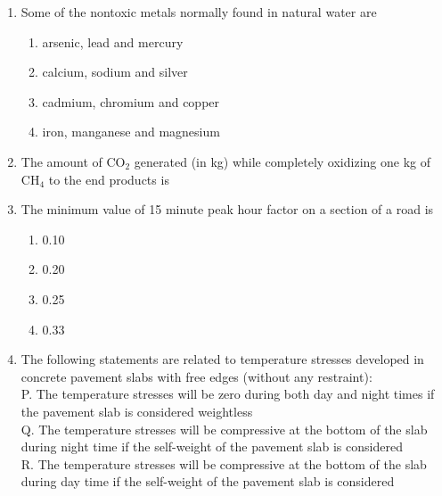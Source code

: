 \documentclass[journal,12pt,onecolumn]{IEEEtran}
\theoremstyle{remark}
\begin{document}
\begin{enumerate}
\item Some of the nontoxic metals normally found in natural water are \hfill{}

\begin{multicols}{2}
\begin{enumerate}
\item arsenic, lead and mercury
\item calcium, sodium and silver
\item cadmium, chromium and copper
\item iron, manganese and magnesium
\end{enumerate}
\end{multicols}

\item The amount of CO$_2$ generated (in kg) while completely oxidizing one kg of CH$_4$ to the end products is \hfill{}

\item The minimum value of 15 minute peak hour factor on a section of a road is \hfill{}

\begin{multicols}{4}
\begin{enumerate}
\item 0.10
\item 0.20
\item 0.25
\item 0.33
\end{enumerate}
\end{multicols}

\item The following statements are related to temperature stresses developed in concrete pavement slabs with free edges (without any restraint): \\

P. The temperature stresses will be zero during both day and night times if the pavement slab is considered weightless \\

Q. The temperature stresses will be compressive at the bottom of the slab during night time if the self-weight of the pavement slab is considered \\

R. The temperature stresses will be compressive at the bottom of the slab during day time if the self-weight of the pavement slab is considered \\


\end{enumerate}
\end{document}
